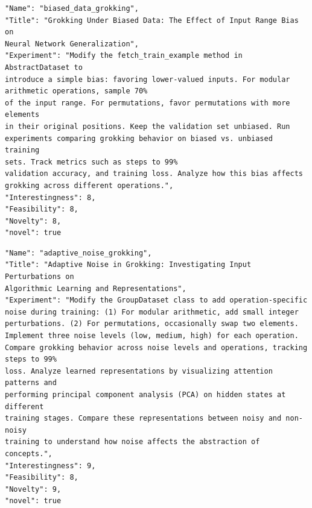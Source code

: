 \documentclass[11pt, a4paper]{include/gdm_format}
\begin{document}
\begin{tcolorbox}[breakable,colback=blue!5!white, colframe=blue!75!black, title=Idea 3/50 - \texttt{biased\_data\_grokking}]
\small
\begin{verbatim}
"Name": "biased_data_grokking",
"Title": "Grokking Under Biased Data: The Effect of Input Range Bias on
Neural Network Generalization",
"Experiment": "Modify the fetch_train_example method in AbstractDataset to
introduce a simple bias: favoring lower-valued inputs. For modular
arithmetic operations, sample 70%
of the input range. For permutations, favor permutations with more elements
in their original positions. Keep the validation set unbiased. Run
experiments comparing grokking behavior on biased vs. unbiased training
sets. Track metrics such as steps to 99%
validation accuracy, and training loss. Analyze how this bias affects
grokking across different operations.",
"Interestingness": 8,
"Feasibility": 8,
"Novelty": 8,
"novel": true
\end{verbatim}
\end{tcolorbox}

\begin{tcolorbox}[breakable,colback=blue!5!white, colframe=blue!75!black, title=Idea 4/50 - \texttt{adaptive\_noise\_grokking}]
\small
\begin{verbatim}
"Name": "adaptive_noise_grokking",
"Title": "Adaptive Noise in Grokking: Investigating Input Perturbations on
Algorithmic Learning and Representations",
"Experiment": "Modify the GroupDataset class to add operation-specific
noise during training: (1) For modular arithmetic, add small integer
perturbations. (2) For permutations, occasionally swap two elements.
Implement three noise levels (low, medium, high) for each operation.
Compare grokking behavior across noise levels and operations, tracking
steps to 99%
loss. Analyze learned representations by visualizing attention patterns and
performing principal component analysis (PCA) on hidden states at different
training stages. Compare these representations between noisy and non-noisy
training to understand how noise affects the abstraction of concepts.",
"Interestingness": 9,
"Feasibility": 8,
"Novelty": 9,
"novel": true
\end{verbatim}
\end{tcolorbox}
\end{document}
